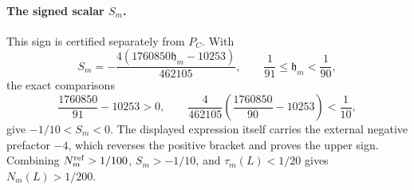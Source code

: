 \paragraph{The signed scalar $S_m$.}
This sign is certified separately from $P_C$.  With
\[
 S_m=-\frac{4(1760850\mathfrak h_m-10253)}{462105},
\qquad \frac1{91}\le\mathfrak h_m<\frac1{90},
\]
the exact comparisons
\[
 \frac{1760850}{91}-10253>0,
 \qquad
 \frac4{462105}\left(\frac{1760850}{90}-10253\right)<\frac1{10},
\]
give $-1/10<S_m<0$.  The displayed expression itself carries the external
negative prefactor $-4$, which reverses the positive bracket and proves the
upper sign.  Combining $N_m^{\rm ref}>1/100$, $S_m>-1/10$, and
$\tau_m(L)<1/20$ gives $N_m(L)>1/200$.
